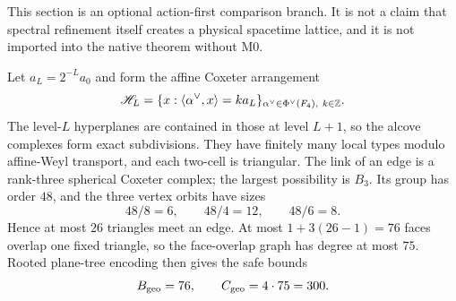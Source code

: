 \documentclass[12pt,a4paper]{article}
\begin{document}
This section is an optional action-first comparison branch.  It is not a
claim that spectral refinement itself creates a physical spacetime lattice,
and it is not imported into the native theorem without M0.

Let $a_L=2^{-L}a_0$ and form the affine Coxeter arrangement
\[
 \mathscr H_L=
 \{x:\langle\alpha^\vee,x\rangle=ka_L\}_{
 \alpha^\vee\in\Phi^\vee(F_4),\ k\in\mathbb{Z}}.
\]
The level-$L$ hyperplanes are contained in those at level $L+1$, so the
alcove complexes form exact subdivisions.  They have finitely many local
types modulo affine-Weyl transport, and each two-cell is triangular.  The link
of an edge is a rank-three spherical Coxeter complex; the largest possibility
is $B_3$.  Its group has order $48$, and the three vertex orbits have sizes
\[
 48/8=6,
 \qquad 48/4=12,
 \qquad 48/6=8.
\]
Hence at most $26$ triangles meet an edge.  At most
$1+3(26-1)=76$ faces overlap one fixed triangle, so the face-overlap graph has
degree at most $75$.  Rooted plane-tree encoding then gives the safe bounds
\begin{equation}
\label{p12:eq:affine-f4-polymer-counts}
 B_{\rm geo}=76,
 \qquad C_{\rm geo}=4\cdot75=300.
\end{equation}
\end{document}
